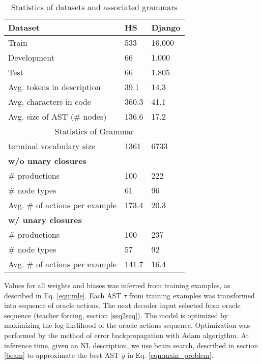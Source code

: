 \begin{table}
\centering
\begin{tabular}{ l l l }
\hline
\textbf{Dataset} & \textbf{HS} & \textbf{Django} \\
\hline 
Train & 533 & 16.000 \\ 
Development & 66 & 1.000 \\ 
Test & 66 & 1.805 \\ 
\hline
Avg. tokens in description & 39.1 & 14.3 \\
Avg. characters in code & 360.3 & 41.1 \\
Avg. size of AST (\# nodes) & 136.6 & 17.2 \\
 \hline
 \hline
\multicolumn{3}{c}{Statistics of Grammar} \\
terminal vocabulary size & 1361 & 6733 \\ 
\hline
\multicolumn{3}{l}{\textbf{w/o unary closures}} \\
\# productions & 100 & 222 \\
\# node types & 61 & 96 \\
Avg. \# of actions per example & 173.4 & 20.3 \\ 
\hline
\multicolumn{3}{l}{\textbf{w/ unary closures}} \\
\# productions & 100 & 237 \\
\# node types & 57 & 92 \\
Avg. \# of actions per example & 141.7 & 16.4 \\ 
\hline
\end{tabular}
\caption{Statistics of datasets and associated grammars}
\end{table}

Values for all weights and biases was inferred from training examples, as described in Eq. \ref{eqn:mle}. Each AST $\tau$ from training examples was transformed into sequence of oracle actions. The next decoder input selected from oracle sequence (teacher forcing, section \ref{seq2seq}). The model is  optimized by maximizing the log-likelihood of the oracle actions sequence. Optimization was performed by the method of error backpropagation with Adam \parencite{Kingma2014} algorigthm. At inference time, given an NL description, we use beam search, described in section \ref{beam} to approximate the best AST $\hat{y}$ in Eq. \ref{eqn:main_problem}.



